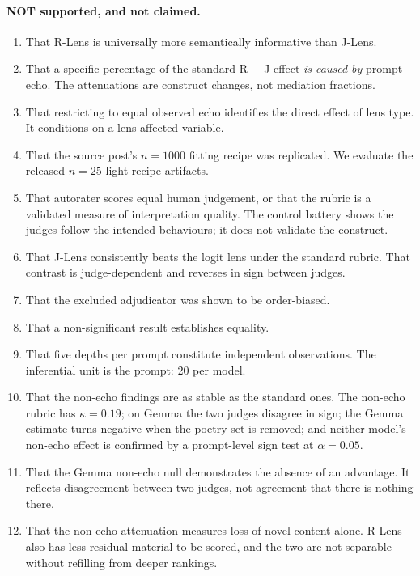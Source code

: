 \documentclass[11pt]{article}
\begin{document}
\paragraph{NOT supported, and not claimed.}
\begin{enumerate}[leftmargin=*,itemsep=1pt]
\item That R-Lens is universally more semantically informative than J-Lens.
\item That a specific percentage of the standard R $-$ J effect \emph{is caused
      by} prompt echo. The attenuations are construct changes, not mediation
      fractions.
\item That restricting to equal observed echo identifies the direct effect of
      lens type. It conditions on a lens-affected variable.
\item That the source post's $n{=}1000$ fitting recipe was replicated. We
      evaluate the released $n{=}25$ light-recipe artifacts.
\item That autorater scores equal human judgement, or that the rubric is a
      validated measure of interpretation quality. The control battery shows the
      judges follow the intended behaviours; it does not validate the construct.
\item That J-Lens consistently beats the logit lens under the standard rubric.
      That contrast is judge-dependent and reverses in sign between judges.
\item That the excluded adjudicator was shown to be order-biased.
\item That a non-significant result establishes equality.
\item That five depths per prompt constitute independent observations. The
      inferential unit is the prompt: 20 per model.
\item That the non-echo findings are as stable as the standard ones. The
      non-echo rubric has $\kappa = 0.19$; on Gemma the two judges disagree in
      sign; the Gemma estimate turns negative when the poetry set is removed;
      and neither model's non-echo effect is confirmed by a prompt-level sign
      test at $\alpha = 0.05$.
\item That the Gemma non-echo null demonstrates the absence of an advantage. It
      reflects disagreement between two judges, not agreement that there is
      nothing there.
\item That the non-echo attenuation measures loss of novel content alone. R-Lens
      also has less residual material to be scored, and the two are not
      separable without refilling from deeper rankings.
\end{enumerate}
\end{document}
